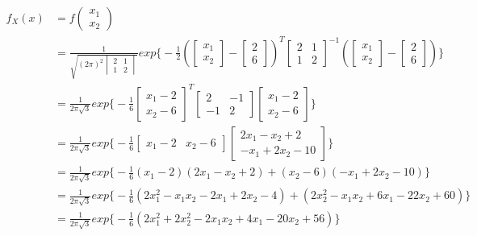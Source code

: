 \documentclass[11pt]{article}
\begin{document}
\begin{enumerate}[label=(\alph*)]
\begin{enumerate}[label=(\roman*)]
\begin{align*}
f_X(x)& =  f
\begin{pmatrix}
x_1\\
x_2
\end{pmatrix} \\
& = \frac{1}{\sqrt{(2\pi)^2
\begin{vmatrix}
2 & 1\\
1 & 2
\end{vmatrix}
}}exp \Big\{ -\frac{1}{2} (
\begin{bmatrix}
x_1\\
x_2
\end{bmatrix}
-
\begin{bmatrix}
2\\
6
\end{bmatrix}
)^T 
\begin{bmatrix}
2 & 1\\
1 & 2
\end{bmatrix}
^{-1} (
\begin{bmatrix}
x_1\\
x_2
\end{bmatrix}
-
\begin{bmatrix}
2\\
6
\end{bmatrix}
)\Big\} \\
&= \frac{1}{2\pi\sqrt{3}}exp \Big\{ -\frac{1}{6} 
\begin{bmatrix}
x_1 - 2\\
x_2 - 6
\end{bmatrix}
^T 
\begin{bmatrix}
2 & -1\\
-1 & 2
\end{bmatrix}
\begin{bmatrix}
x_1 - 2\\
x_2 - 6
\end{bmatrix}
\Big\} \\
& = \frac{1}{2\pi\sqrt{3}}exp \Big\{ -\frac{1}{6} 
\begin{bmatrix}
x_1 - 2 & x_2 - 6
\end{bmatrix}
\begin{bmatrix}
2x_1 - x_2 + 2\\
-x_1 + 2x_2 - 10
\end{bmatrix}
\Big\} \\
& = \frac{1}{2\pi\sqrt{3}}exp \Big\{ -\frac{1}{6} (x_1 - 2)(2x_1 - x_2 + 2) + (x_2 - 6)(-x_1 + 2x_2 - 10)\Big\} \\
& = \frac{1}{2\pi\sqrt{3}}exp \Big\{ -\frac{1}{6} (2x_1^2-x_1 x_2 - 2x_1 + 2x_2 -4) + (2x_2^2-x_1 x_2+6x_1-22x_2+60)\Big\} \\
& = \frac{1}{2\pi\sqrt{3}}exp \Big\{ -\frac{1}{6} (2x_1^2+2x_2^2 - 2x_1 x_2 + 4x_1 -20x_2 +56)\Big\} \\
\end{align*}


\end{enumerate}
\end{enumerate}
\end{document}
